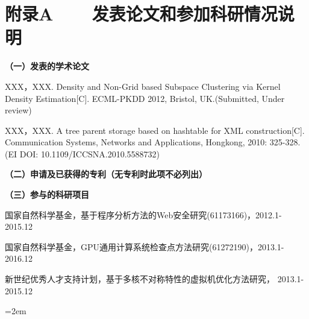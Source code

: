 
\chapter*{附录A~~~~发表论文和参加科研情况说明}
\setlength{\parindent}{0em}
\textbf{（一）发表的学术论文}
\begin{publist}
	\item XXX，XXX. Density and Non-Grid based Subspace Clustering via Kernel Density Estimation[C]. ECML-PKDD 2012, Bristol, UK.(Submitted, Under review)
	\item XXX，XXX. A tree parent storage based on hashtable for XML construction[C]. Communication Systems, Networks and Applications, Hongkong, 2010: 325-328. (EI DOI: 10.1109/ICCSNA.2010.5588732)
\end{publist}

\vspace*{1em}
\textbf{（二）申请及已获得的专利（无专利时此项不必列出）}

\vspace*{1em}
\textbf{（三）参与的科研项目}
\begin{publist}
\item 国家自然科学基金，基于程序分析方法的Web安全研究(61173166)，2012.1-2015.12

\item 国家自然科学基金，GPU通用计算系统检查点方法研究(61272190)，2013.1-2016.12

\item 新世纪优秀人才支持计划，基于多核不对称特性的虚拟机优化方法研究， 2013.1-2015.12
\end{publist}
\vfill
{}\hangindent=2em\noindent

\setlength{\parindent}{2em}
